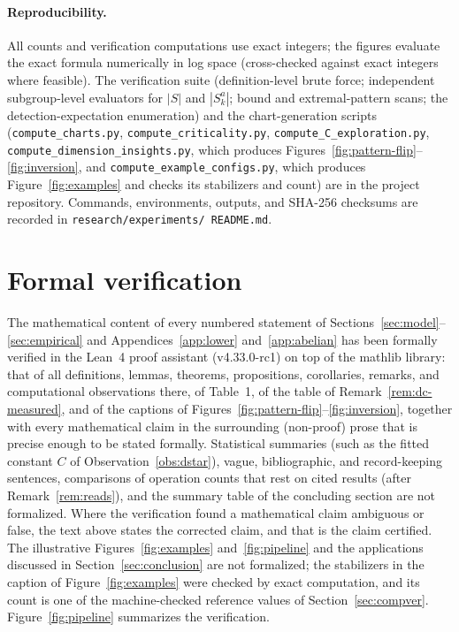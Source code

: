 \documentclass[11pt,a4paper]{article}
\theoremstyle{remark}
\begin{document}
\paragraph{Reproducibility.}
\begin{sloppypar}
All counts and verification computations use exact integers; the figures
evaluate the exact formula numerically in log space (cross-checked against
exact integers where feasible). The verification suite
(definition-level brute force; independent subgroup-level evaluators for
$|S|$ and $|S^a_k|$; bound and extremal-pattern scans; the
detection-expectation enumeration) and the chart-generation scripts
(\texttt{compute\_charts.py}, \texttt{compute\_criticality.py},
\texttt{compute\_C\_exploration.py}, \texttt{compute\_dimension\_insights.py},
which produces Figures~\ref{fig:pattern-flip}--\ref{fig:inversion}, and
\texttt{compute\_example\_configs.py}, which produces Figure~\ref{fig:examples}
and checks its stabilizers and count) are in the project
repository. Commands, environments, outputs, and SHA-256 checksums are
recorded in \texttt{research/\allowbreak experiments/\allowbreak
README.md}.
\end{sloppypar}

\section{Formal verification}\label{sec:formal}

The mathematical content of every numbered statement of
Sections~\ref{sec:model}--\ref{sec:empirical} and
Appendices~\ref{app:lower} and~\ref{app:abelian} has been formally verified in the Lean~4 proof
assistant (v4.33.0-rc1) on top of the \textsf{mathlib} library: that of
all definitions, lemmas, theorems, propositions, corollaries, remarks,
and computational observations there, of Table~1, of the table of
Remark~\ref{rem:dc-measured}, and of the captions of
Figures~\ref{fig:pattern-flip}--\ref{fig:inversion}, together with every
mathematical claim in the surrounding (non-proof) prose that is precise
enough to be stated formally. Statistical summaries (such as the fitted
constant $C$ of Observation~\ref{obs:dstar}), vague, bibliographic, and
record-keeping sentences, comparisons of operation counts that rest on
cited results (after Remark~\ref{rem:reads}), and the summary table of the
concluding section are not formalized. Where the verification found
a mathematical claim ambiguous or false, the text
above states the corrected claim, and that is the claim certified. The
illustrative Figures~\ref{fig:examples} and~\ref{fig:pipeline} and the
applications discussed in Section~\ref{sec:conclusion} are not formalized;
the stabilizers in the caption of Figure~\ref{fig:examples} were checked by
exact computation, and its count is one of the machine-checked reference
values of Section~\ref{sec:compver}.
Figure~\ref{fig:pipeline} summarizes the verification.
\end{document}
